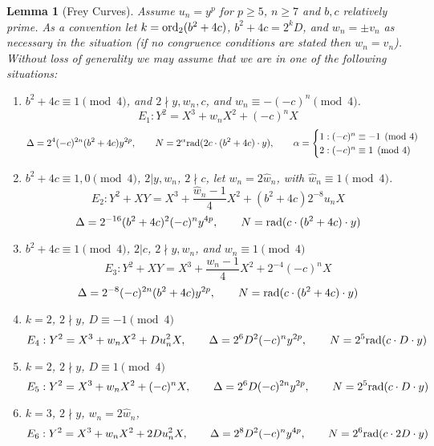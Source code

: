 \documentclass[12pt]{amsart}
\newtheorem{lem}[thm]{Lemma}
\theoremstyle{definition}
\newcommand{\rad}{{\rm{rad}}}
\newcommand{\notdiv}{\nmid}
\newcommand{\ord}{{\rm{ord}}}
\begin{document}
\begin{lem}[Frey Curves]\label{freycurves}
Assume $u_n = y^p$ for $p\geq 5$, $n \geq 7$ and $b,c$ relatively prime.  As a convention let $k = \ord_2(b^2+4c)$,  $b^2+4c = 2^kD$, and $w_n = \pm v_n$ as necessary in the situation (if no congruence conditions are stated then $w_n = v_n$).  Without loss of generality we may assume that we are in one of the following situations:



\begin{enumerate}[1.]

\item $b^2+4c \equiv 1 \pmod{4}$, and $2 \notdiv y,w_n,c$, and $w_n \equiv -(-c)^n \pmod{4}$.
\[ E_1: Y^2 = X^3 + w_nX^2 + (-c)^nX \]
\[ \Delta = 2^4(-c)^{2n}(b^2+4c)y^{2p},  \qquad N = 2^{\alpha} \rad(2c \cdot (b^2+4c) \cdot y), \qquad \alpha =  \begin{cases} 1: (-c)^n \equiv -1 \pmod{4}\\ 2 : (-c)^n \equiv 1 \pmod{4} \end{cases} \]

\item $b^2+4c \equiv 1,0 \pmod{4}$, $2|y,w_n$, $2 \notdiv c$, let $w_n = 2\hat{w}_n$, with $\hat{w}_n \equiv 1 \pmod{4}$.
\[ E_{2} : Y^2 +XY = X^3 + \frac{\hat{w}_n - 1}{4} X^2 + (b^2+4c)2^{-8}u_nX \]
\[ \Delta = 2^{-16}(b^2+4c)^2(-c)^ny^{4p}, \qquad N = \rad( c \cdot (b^2+4c)\cdot y)  \]

\item $b^2+4c \equiv 1 \pmod{4}$, $2|c$, $2 \notdiv y,w_n$, and $w_n \equiv 1 \pmod{4}$
\[ E_{3}: Y^2 +XY = X^3 +\frac{w_n-1}{4}X^2 +2^{-4}(-c)^nX \]
\[ \Delta = 2^{-8}(-c)^{2n}(b^2+4c)y^{2p} , \qquad N =\rad( c \cdot (b^2+4c)\cdot y)  \]

\item $k = 2$, $2 \notdiv y$, $D \equiv -1 \pmod{4}$
\[ E_{4} : Y^2 = X^3 + w_nX^2 +Du_n^2X, \qquad \Delta = 2^{6}D^2(-c)^ny^{2p}, \qquad N = 2^{5}\rad( c \cdot D \cdot y )  \]

\item $k = 2$, $2 \notdiv y$,  $D \equiv 1 \pmod{4}$
\[E_{5} : Y^2 = X^3 +w_nX^2 +(-c)^nX, \qquad \Delta = 2^{6}D(-c)^{2n}y^{2p}, \qquad N = 2^{5}\rad( c \cdot D \cdot y )  \]

\item $k = 3$, $2 \notdiv y$, $w_n = 2 \hat{w}_n$, 
\[ E_{6} : Y^2 = X^3 + w_nX^2 + 2Du_n^2X, \qquad  \Delta = 2^8D^2(-c)^ny^{4p} , \qquad N = 2^6 \rad( c \cdot 2D \cdot y)  \]


\end{enumerate}
\end{lem}
\end{document}
